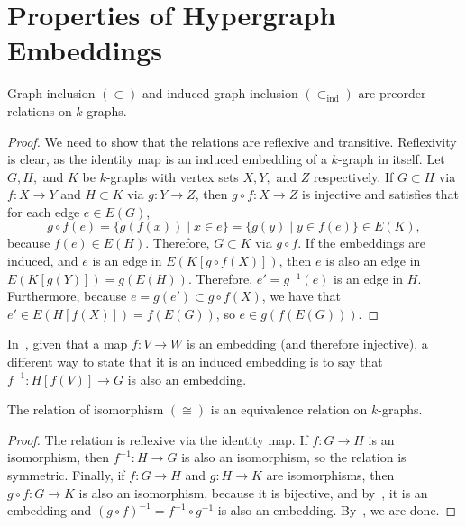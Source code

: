 \vfill\newpage \section{Properties of Hypergraph Embeddings}\label{apx:embeddings-properties}

\begin{proposition}\label{prop:embedding_properties}
    Graph inclusion $(\subset)$ and induced graph inclusion $\left(\subset_{\text{ind}}\right)$
    are preorder relations on $k$-graphs.
    \begin{proof}
        We need to show that the relations are reflexive and transitive.
        Reflexivity is clear, as the identity map is an induced embedding of a $k$-graph in itself.
        Let $G, H,$ and $K$ be $k$-graphs with vertex sets $X, Y,$ and $Z$ respectively.
        If $G \subset H$ via $f: X \to Y$ and $H \subset K$ via $g: Y \to Z$,
        then $g \circ f: X \to Z$ is injective and satisfies that for each edge $e \in E(G)$,
        \[
            g \circ f(e) =
            \{g(f(x))\mid x \in e\} =
            \{g(y) \mid y \in f(e)\} \in E(K),
        \]
        because $f(e) \in E(H)$.
        Therefore, $G \subset K$ via $g \circ f$.
        If the embeddings are induced,
        and $e$ is an edge in
        $E(K[g \circ f(X)])$,
        then $e$ is also an edge in $E(K[g (Y)]) = g(E(H))$.
        Therefore, $e' = g^{-1}(e)$ is an edge in $H$.
        Furthermore, because $e = g(e') \subset g \circ f(X)$,
        we have that $e' \in E(H[f(X)]) = f(E(G))$,
        so $e \in g(f(E(G)))$.
    \end{proof}
\end{proposition}

\begin{remark} \label{rem:inverse_embedding}
    In~, given that a map $f: V \to W$ is an embedding
    (and therefore injective),
    a different way to state that it is an induced embedding is to say that
    $f^{-1}: H[f(V)] \to G$ is also an embedding.
\end{remark}

\begin{proposition}\label{prop:isomorphism_equivalence}
    The relation of isomorphism $(\cong)$ is an equivalence relation on $k$-graphs.
    \begin{proof}
        The relation is reflexive via the identity map.
        If $f: G \to H$ is an isomorphism, then $f^{-1}: H \to G$ is also an isomorphism,
        so the relation is symmetric.
        Finally, if $f: G \to H$ and $g: H \to K$ are isomorphisms,
        then $g \circ f: G \to K$ is also an isomorphism, because it is bijective,
        and by~,
        it is an embedding
        and $(g \circ f)^{-1} = f^{-1} \circ g^{-1}$ is also an embedding.
        By~, we are done.
    \end{proof}
\end{proposition}

